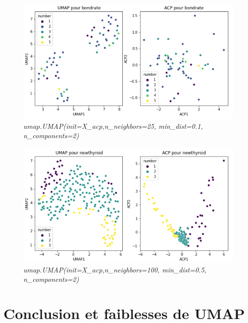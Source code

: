 \documentclass{beamer}
\theoremstyle{definition}
\begin{document}
\begin{frame}
	\begin{figure}
		\centering		
		\includegraphics[scale=0.4]{bondrate.png}
		\textit{umap.UMAP(init=X\_acp,n\_neighbors=25, min\_dist=0.1, n\_components=2)}
	\end{figure}
	
\end{frame}

\begin{frame}
	\begin{figure}
		\centering		
		\includegraphics[scale=0.4]{thyroide.png}
		\textit{umap.UMAP(init=X\_acp,n\_neighbors=100, min\_dist=0.5, n\_components=2)}
	\end{figure}
	
\end{frame}

\section{Conclusion et faiblesses de UMAP}
\end{document}
